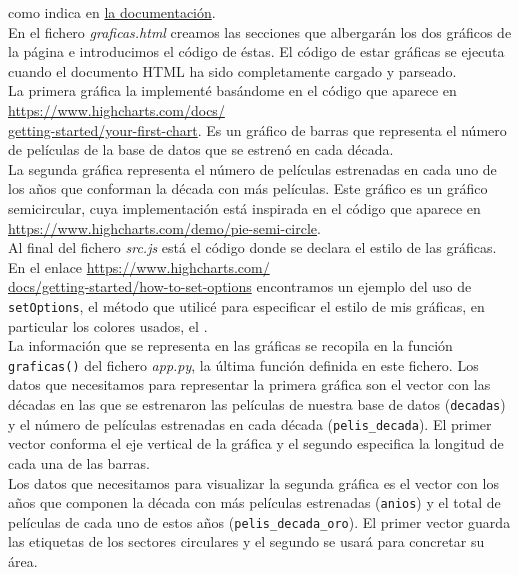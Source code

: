 \documentclass{article}
\begin{document}
como indica en \href{https://www.highcharts.com/docs/getting-started/installation}{la documentación}.\\

En el fichero \textit{graficas.html} creamos las secciones que albergarán los dos gráficos de la página e introducimos el código de éstas. El código de estar gráficas se ejecuta cuando el documento HTML ha sido completamente cargado y parseado.\\

La primera gráfica la implementé basándome en el código que aparece en \href{https://www.highcharts.com/docs/getting-started/your-first-chart}{https://www.highcharts.com/docs/\\getting-started/your-first-chart}. Es un gráfico de barras que representa el número de películas de la base de datos que se estrenó en cada década.\\

La segunda gráfica representa el número de películas estrenadas en cada uno de los años que conforman la década con más películas. Este gráfico es un gráfico semicircular, cuya implementación está inspirada en el código que aparece en  \href{https://www.highcharts.com/demo/pie-semi-circle}{https://www.highcharts.com/demo/pie-semi-circle}.\\

Al final del fichero \textit{src.js} está el código donde se declara el estilo de las gráficas. En el enlace \href{https://www.highcharts.com/docs/getting-started/how-to-set-options}{https://www.highcharts.com/\\docs/getting-started/how-to-set-options} encontramos un ejemplo del uso de \texttt{setOptions}, el método que utilicé para especificar el estilo de mis gráficas, en particular los colores usados, el .\\

La información que se representa en las gráficas se recopila en la función \texttt{graficas()} del fichero \textit{app.py}, la última función definida en este fichero. Los datos que necesitamos para representar la primera gráfica son el vector con las décadas en las que se estrenaron las películas de nuestra base de datos (\texttt{decadas}) y el número de películas estrenadas en cada década (\texttt{pelis\_decada}). El primer vector conforma el eje vertical de la gráfica y el segundo especifica la longitud de cada una de las barras.\\

Los datos que necesitamos para visualizar la segunda gráfica es el vector con los años que componen la década con más películas estrenadas (\texttt{anios}) y el total de películas de cada uno de estos años (\texttt{pelis\_decada\_oro}). El primer vector guarda las etiquetas de los sectores circulares y el segundo se usará para concretar su área.\\
\end{document}

